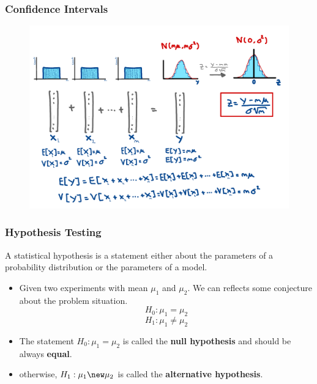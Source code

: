 \begin{frame}
    \frametitle{Confidence Intervals}
    \begin{figure}
        \centering
        \includegraphics[width=1\textwidth]{slides/figures/clt_examples.pdf}
    \end{figure}
\end{frame}



\begin{frame}
    \frametitle{Hypothesis Testing}

    A statistical hypothesis is a statement either about the parameters of a 
    probability distribution or the parameters of a model.



    \begin{itemize}

        \item Given two experiments with mean $\mu_1$ and $\mu_2$. We can reflects some conjecture
        about the problem situation.
        $$H_0: \mu_1 = \mu_2$$
        $$H_1: \mu_1\neq\mu_2$$

        \item The statement $H_0: \mu_1=\mu_2$ is called the \textbf{null hypothesis} and
        should be always \textbf{equal}.
        \item otherwise, $H_1: \mu_1\new\mu_2$ is called the \textbf{alternative hypothesis}.
    \end{itemize}
\end{frame}



